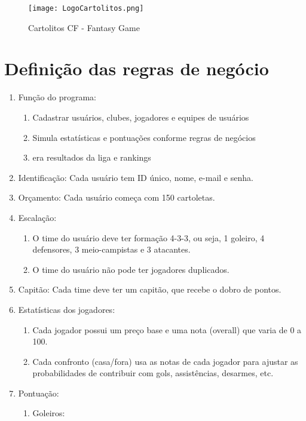 \documentclass[12pt]{article}
\begin{document}
\begin{figure}[H]
  \centering
  \texttt{[image: LogoCartolitos.png]}
  \caption{Cartolitos CF - Fantasy Game}
  \label{fig:cartolitos}
\end{figure}


\section{Definição das regras de negócio}
\label{sec:regras}

\begin{enumerate}
  \item Função do programa:
        \begin{enumerate}
          \item Cadastrar usuários, clubes, jogadores e equipes de usuários
          \item Simula estatísticas e pontuações conforme regras de negócios
          \item era resultados da liga e rankings
        \end{enumerate}
  \item Identificação: Cada usuário tem ID único, nome, e-mail e senha.
  \item Orçamento: Cada usuário começa com 150 cartoletas.
  \item Escalação:
        \begin{enumerate}
          \item O time do usuário deve ter formação 4-3-3, ou seja, 1 goleiro, 4 defensores, 3 meio-campistas e 3 atacantes.
          \item O time do usuário não pode ter jogadores duplicados.
        \end{enumerate}
  \item Capitão: Cada time deve ter um capitão, que recebe o dobro de pontos.
  \item Estatísticas dos jogadores:
        \begin{enumerate}
          \item Cada jogador possui um preço base e uma nota (overall) que varia de 0 a 100.
          \item Cada confronto (casa/fora) usa as notas de cada jogador para ajustar as probabilidades de contribuir com gols, assistências, desarmes, etc.
        \end{enumerate}
  \item Pontuação:
        \begin{enumerate}
          \item Goleiros:

\end{enumerate}
\end{enumerate}
\end{document}
